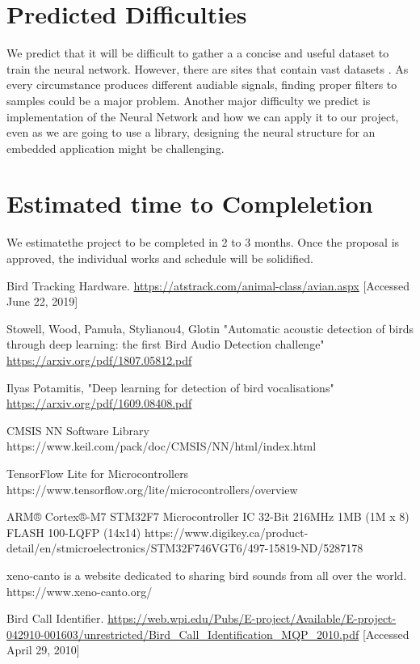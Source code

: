 \documentclass[12pt,journal,compsoc]{IEEEtran}
\begin{document}
\section{Predicted Difficulties}
We predict that it will be difficult to gather a a concise and useful dataset to train the neural network. However, there are sites that contain vast datasets \cite{Bird}. As every circumstance produces different audiable signals, finding proper filters to samples could be a major problem. Another major difficulty we predict is implementation of the  Neural Network and how we can apply it to our project, even as we are going to use a library, designing the neural structure for an embedded application might be challenging.

\section{Estimated time to Compleletion}
We estimatethe project to be completed in 2 to 3 months. Once the proposal is approved, the individual works and schedule will be solidified.

\begin{thebibliography}{1}

Bird Tracking Hardware.
\url{https://atstrack.com/animal-class/avian.aspx} [Accessed June 22, 2019]


Stowell, Wood, Pamuła, Stylianou4, Glotin "Automatic acoustic detection of birds through deep learning: the first Bird Audio Detection challenge"
\url{https://arxiv.org/pdf/1807.05812.pdf}

Ilyas Potamitis, "Deep learning for detection of bird vocalisations"
\url{https://arxiv.org/pdf/1609.08408.pdf}

CMSIS NN Software Library
https://www.keil.com/pack/doc/CMSIS/NN/html/index.html

TensorFlow Lite for Microcontrollers
https://www.tensorflow.org/lite/microcontrollers/overview

ARM® Cortex®-M7 STM32F7 Microcontroller IC 32-Bit 216MHz 1MB (1M x 8) FLASH 100-LQFP (14x14)
https://www.digikey.ca/product-detail/en/stmicroelectronics/STM32F746VGT6/497-15819-ND/5287178

xeno-canto is a website dedicated to sharing bird sounds from all over the world.
https://www.xeno-canto.org/


Bird Call Identifier.
\url{https://web.wpi.edu/Pubs/E-project/Available/E-project-042910-001603/unrestricted/Bird_Call_Identification_MQP_2010.pdf} [Accessed April 29, 2010]

\end{thebibliography}
\end{document}
